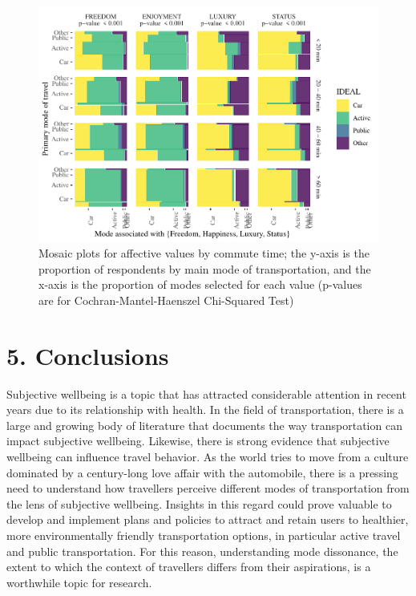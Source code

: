 \documentclass[]{elsarticle} %
\makeatletter
\def\maxwidth{\ifdim\Gin@nat@width>\linewidth\linewidth
\else\Gin@nat@width\fi}
\let\Oldincludegraphics\includegraphics
\renewcommand{\includegraphics}[1]{\Oldincludegraphics[width=\maxwidth]{#1}}
\makeatother
\begin{document}
\begin{figure}
\centering
\includegraphics{Dissonance_Santiago_v1_files/figure-latex/figure-mosaic-plots-by-attribute-and-time-1.pdf}
\caption{\label{fig:mosaic-plots-by-travel-time}Mosaic plots for
affective values by commute time; the y-axis is the proportion of
respondents by main mode of transportation, and the x-axis is the
proportion of modes selected for each value (p-values are for
Cochran-Mantel-Haenszel Chi-Squared Test)}
\end{figure}

\hypertarget{conclusions}{%
\section{5. Conclusions}\label{conclusions}}

Subjective wellbeing is a topic that has attracted considerable
attention in recent years due to its relationship with health. In the
field of transportation, there is a large and growing body of literature
that documents the way transportation can impact subjective wellbeing.
Likewise, there is strong evidence that subjective wellbeing can
influence travel behavior. As the world tries to move from a culture
dominated by a century-long love affair with the automobile, there is a
pressing need to understand how travellers perceive different modes of
transportation from the lens of subjective wellbeing. Insights in this
regard could prove valuable to develop and implement plans and policies
to attract and retain users to healthier, more environmentally friendly
transportation options, in particular active travel and public
transportation. For this reason, understanding mode dissonance, the
extent to which the context of travellers differs from their
aspirations, is a worthwhile topic for research.
\end{document}
